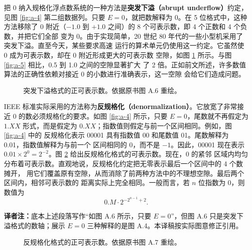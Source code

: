 把 0 纳入规格化浮点数系统的一种方法是\textbf{突发下溢（abrupt underflow）}约定，见图
\ref{fig:a-4} 第二组数据列。只要 $E=0$，就把数解释为 0。在 5 位格式中，这种方法移除了
0 附近（$-1.0$ 到 $+1.0$ 之间）的 8 个可表示数，即 4 个正数和 4 个负数，并把它们全部
变为 0。由于实现简单，20 世纪 80 年代的一些小型机采用了突发下溢。直至今天，某些要求高速
运行的算术单元仍使用这一约定。它虽然使 0 成为可表示数，却在 0 附近形成更大的可表示数
空隙，如图 \ref{fig:a-6} 所示。与图 \ref{fig:a-5} 相比，0.5 到 1.0 之间的空隙显著扩大
了 2 倍。正如前文所述，许多数值算法的正确性依赖对接近 0 的小数进行准确表示，这一空隙
会给它们造成问题。

\begin{figure}[htbp]
  \centering
  \caption{突发下溢格式的正可表示数。依据原书图 A.6 重绘。}
  \label{fig:a-6}
\end{figure}

IEEE 标准实际采用的方法称为\textbf{反规格化（denormalization）}。它放宽了非常接近 0
的数必须规格化的要求。如图 \ref{fig:a-4} 所示，只要 $E=0$，尾数就不再假定为 $1.XX$
形式，而是假定为 $0.XX$；指数值则假定与前一个区间相同。例如，图 \ref{fig:a-4} 中的
反规格化表示 00001 具有指数值 00 和尾数值 01。尾数解释为 0.01，指数值解释为与前一个
区间相同的 0，而不是 $-1$。因此，00001 现在表示
$0.01\times2^0=2^{-2}$。图 \ref{fig:a-7} 给出反规格化格式的可表示数。现在，0 的紧邻
区域内均匀分布着可表示数。直观地说，反规格化约定把无零表示最后一个区间中的 4 个数摊开，
用它们覆盖原有空隙，从而消除了前两种方法中的不理想空隙。最后两个区间内，相邻可表示数的
距离实际上完全相同。一般而言，若 $n$ 位指数为 0，则数值为
\[
  0.M\cdot2^{-2^{n-1}+2}.
\]

\noindent\textbf{译者注：}底本上述段落写作“如图 A.6 所示，只要 $E=0$”，但图 A.6
只是突发下溢格式的数轴；展示 $E=0$ 三种解释的是图 A.4。本译稿按实际图意修正引用。

\begin{figure}[htbp]
  \centering
  \caption{反规格化格式的正可表示数。依据原书图 A.7 重绘。}
  \label{fig:a-7}
\end{figure}

